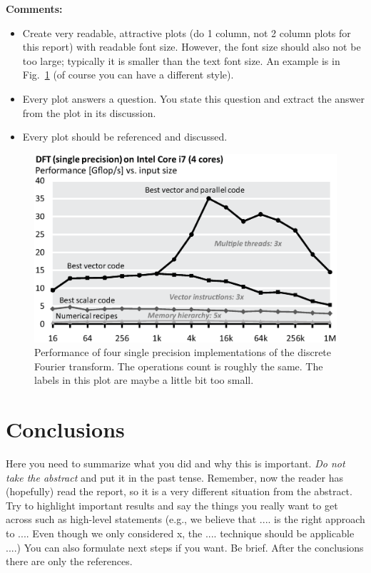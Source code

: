 \documentclass[letterpaper]{article}
\begin{document}
	
	
	{\bf Comments:}
	\begin{itemize}
	\item Create very readable, attractive plots (do 1 column, not 2 column plots
	for this report) with readable font size. However, the font size should also not be too large; typically it is smaller than the text font size.
	An example is in Fig.~\ref{fftperf} (of course you can have a different style).
	\item Every plot answers a question. You state this question and extract the
	answer from the plot in its discussion.
	\item Every plot should be referenced and discussed.
	\end{itemize}
	
	\begin{figure}\centering
	  \includegraphics[scale=0.33]{dft-performance.eps}
	  \caption{Performance of four single precision implementations of the
	  discrete Fourier transform. The operations count is roughly the
	  same. The labels in this plot are maybe a little bit too small.\label{fftperf}}
	\end{figure}
	
	
	
	\section{Conclusions}
	
	Here you need to summarize what you did and why this is
	important. {\em Do not take the abstract} and put it in the past
	tense. Remember, now the reader has (hopefully) read the report, so it
	is a very different situation from the abstract. Try to highlight
	important results and say the things you really want to get across
	such as high-level statements (e.g., we believe that .... is the right
	approach to .... Even though we only considered x, the
	.... technique should be applicable ....) You can also formulate next
	steps if you want. Be brief. After the conclusions there are only the references.
	
\end{document}

